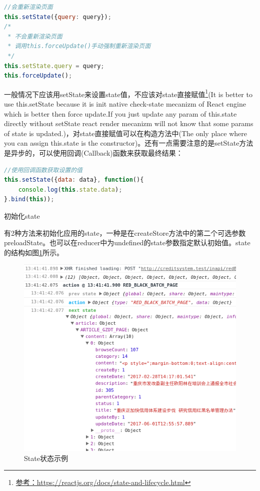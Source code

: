 \documentclass[12pt]{book}
\makeatletter
\numberwithin{dummy}{section}
\theoremstyle{ocrenumbox}
\theoremstyle{blacknumex}
\theoremstyle{blacknumbox}
\theoremstyle{ocrenum}
\renewcommand\paragraph{\@startsection{paragraph}{4}{\z@}
	{-2ex \@plus-.2ex \@minus .2ex}
	{.1ex}
	{\normalfont\small\sffamily\bfseries}}
\makeatother
\begin{document}
\begin{lstlisting}[language=Javascript]
//会重新渲染页面
this.setState({query: query});
/*
 * 不会重新渲染页面
 * 调用this.forceUpdate()手动强制重新渲染页面
 */
this.setState.query = query;
this.forceUpdate();
\end{lstlisting}

一般情况下应该用setState来设置state值，不应该对state直接赋值\footnote{\url{参考：https://reactjs.org/docs/state-and-lifecycle.html}}(It is better to use this.setState because it is init native check-state mecanizm of React engine which is better then force update.If you just update any param of this.state directly without setState react render mecanizm will not know that some params of state is updated.)，对state直接赋值可以在构造方法中(The only place where you can assign this.state is the constructor)。还有一点需要注意的是setState方法是异步的，可以使用回调(Callback)函数来获取最终结果：

\begin{lstlisting}[language=Javascript]
//使用回调函数获取设置的值
this.setState({data: data}, function(){
	console.log(this.state.data);
}.bind(this));
\end{lstlisting}

\paragraph{初始化state}

有2种方法来初始化应用的state，一种是在createStore方法中的第二个可选参数preloadState。也可以在reducer中为undefined的state参数指定默认初始值。state的结构如图\ref{fig:statedemo}所示。

\begin{figure}[htbp]
	\centering
	\includegraphics[scale=0.6]{statedemo.png}
	\caption{State状态示例}
	\label{fig:statedemo}
\end{figure}
\end{document}

